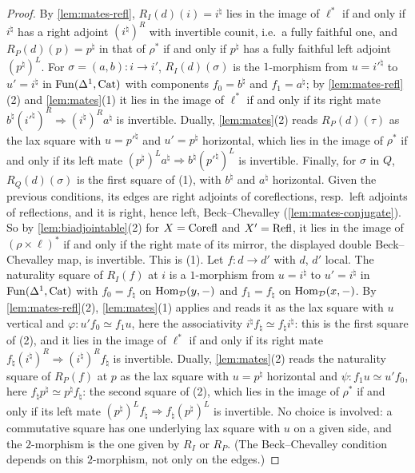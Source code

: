\begin{proof}
By \cref{lem:mates-refl},
$R_{I}(d)(i) = i^{\natural}$
lies in the image of $\ell^{*}$ if and only if $i^{\natural}$ has a right
adjoint $(i^{\natural})^{R}$ with invertible counit, i.e.\ a fully faithful one,
and
$R_{P}(d)(p) = p^{\natural}$
in that of $\rho^{*}$ if and only if $p^{\natural}$ has a fully faithful left
adjoint $(p^{\natural})^{L}$. For
$\sigma = (a,b)\colon i \to i'$,
$R_{I}(d)(\sigma)$ is the $1$-morphism from $u = i'^{\natural}$ to $u' =
i^{\natural}$ in
$\operatorname{Fun}(\Delta^{1},\mathrm{Cat})$
with components $f_{0} = b^{\natural}$ and $f_{1} = a^{\natural}$;
by \cref{lem:mates-refl}(2) and \cref{lem:mates}(1) it lies in the image of
$\ell^{*}$ if and only if its right mate
$b^{\natural}(i'^{\natural})^{R} \Rightarrow (i^{\natural})^{R}a^{\natural}$
is invertible. Dually, \cref{lem:mates}(2) reads $R_{P}(d)(\tau)$ as the lax
square with $u = p'^{\natural}$ and $u' = p^{\natural}$ horizontal,
which lies in the image of $\rho^{*}$ if and only if its left mate
$(p^{\natural})^{L}a^{\natural} \Rightarrow b^{\natural}(p'^{\natural})^{L}$
is invertible. Finally, for $\sigma$ in $Q$, $R_{Q}(d)(\sigma)$ is the first
square of (1), with $b^{\natural}$ and $a^{\natural}$ horizontal.
Given the previous conditions, its edges are right adjoints of coreflections,
resp.\ left adjoints of reflections, and it is right, hence left,
Beck--Chevalley (\cref{lem:mates-conjugate}).
So by \cref{lem:biadjointable}(2) for $X = \mathrm{Corefl}$ and $X' = \mathrm{Refl}$,
it lies in the image of
$(\rho \times \ell)^{*}$
if and only if the right mate
of its mirror, the displayed double Beck--Chevalley map, is invertible.
This is (1).
Let $f\colon d \to d'$ with $d$, $d'$ local.
The naturality square of $R_{I}(f)$ at $i$ is a $1$-morphism from $u =
i^{\natural}$ to $u' = i^{\natural}$ in
$\operatorname{Fun}(\Delta^{1},\mathrm{Cat})$
with $f_{0} = f_{\natural}$ on $\operatorname{Hom}_{\mathcal{D}}(y,-)$ and $f_{1} = f_{\natural}$ on
$\operatorname{Hom}_{\mathcal{D}}(x,-)$. By \cref{lem:mates-refl}(2),
\cref{lem:mates}(1) applies and reads it as the lax square with $u$ vertical and
$\varphi\colon u'f_{0} \simeq f_{1}u$,
here the associativity
$i^{\natural}f_{\natural} \simeq f_{\natural}i^{\natural}$:
this is the first square of (2), and it lies in the image of $\ell^{*}$ if and
only if its right mate
$f_{\natural}(i^{\natural})^{R} \Rightarrow (i^{\natural})^{R}f_{\natural}$
is invertible. Dually, \cref{lem:mates}(2) reads the naturality square of
$R_{P}(f)$ at $p$ as the lax square with $u = p^{\natural}$ horizontal and
$\psi\colon f_{1}u \simeq u'f_{0}$,
here
$f_{\natural}p^{\natural} \simeq p^{\natural}f_{\natural}$:
the second square of (2), which lies in the image of $\rho^{*}$ if and only if
its left mate
$(p^{\natural})^{L}f_{\natural} \Rightarrow f_{\natural}(p^{\natural})^{L}$
is invertible.
No choice is involved: a commutative square has one underlying lax square with
$u$ on a given side, and the $2$-morphism is the one given by $R_{I}$ or
$R_{P}$. (The Beck--Chevalley condition depends on this $2$-morphism,
not only on the edges.)
\end{proof}

